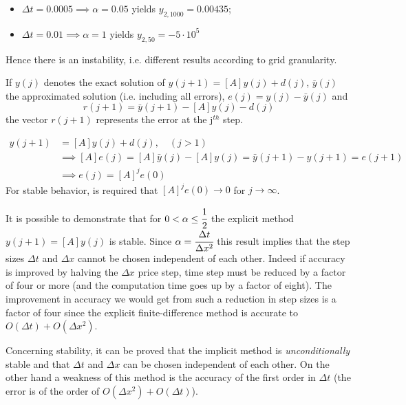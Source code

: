 \begin{itemize}
\item $\Delta t = 0.0005 \implies \alpha = 0.05$ yields $y_{2,1000}=0.00435$;
\item $\Delta t = 0.01 \implies \alpha = 1$ yields $y_{2,50}=-5\cdot 10^5$
\end{itemize}
Hence there is an instability, i.e. different results according to grid granularity.

If $y(j)$ denotes the exact solution of $y(j+1) = [A] y(j) + d(j)$, $\bar{y}(j)$ the approximated solution (i.e. including all errors), $e(j) = y(j)-\bar{y}(j)$ and
\begin{equation}
r(j+1) = \bar{y}(j+1) − [A]y(j) − d(j)
\end{equation}
\noindent
the vector $r(j+1)$ represents the error at the j$^{th}$ step. %

\begin{equation}
\begin{split}
y(j+1) &= [A]y(j) + d(j),\quad (j > 1) \\
&\implies [A]e(j) = [A]\bar{y}(j) − [A]y(j) = \bar{y}(j+1) − y(j+1) = e(j+1) \\
&\implies e(j) = [A]^j e(0)
\end{split}
\end{equation}
For stable behavior, is required that $[A]^j e(0) \rightarrow 0$ for $j\rightarrow\infty$.

It is possible to demonstrate that for $0< \alpha\leq\cfrac{1}{2}$ the explicit method $y(j+1) = [A]y(j)$ is stable.
Since $\alpha=\cfrac{\Delta t}{\Delta x^2}$ this result implies that the step sizes $\Delta t$ and $\Delta x$  cannot be chosen independent of each other.
Indeed if accuracy is improved by halving the $\Delta x$ price step, time step must be reduced by a factor of four or more (and the computation time goes up by a factor of eight). The improvement in accuracy we would get from such a reduction in step sizes is a factor of four since the explicit finite-difference method is accurate to $O(\Delta t) + O(\Delta x^2)$.

Concerning stability, it can be proved that the implicit method is \emph{unconditionally} stable and that $\Delta t$ and $\Delta x$ can be chosen independent of each other.
On the other hand a weakness of this method is the accuracy of the first order in $\Delta t$ (the error is of the order of $O(\Delta x^2) + O(\Delta t)$). 

